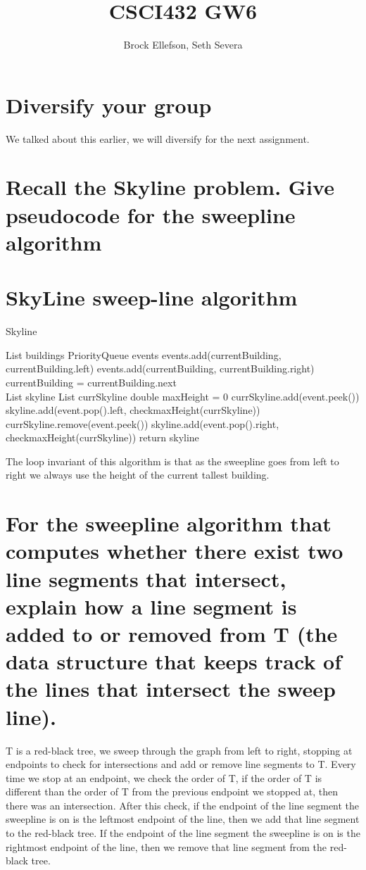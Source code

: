 \documentclass[10pt,a4paper]{article}
\author{Brock Ellefson, Seth Severa}
\title{CSCI432 GW6}
\begin{document}
\maketitle
\section{Diversify your group}
We talked about this earlier, we will diversify for the next assignment.
\section{Recall the Skyline problem. Give pseudocode for the sweepline algorithm}
\section*{SkyLine sweep-line algorithm}
\begin{algorithm}
\caption{Skyline}\label{euclid}
\begin{algorithmic}[1]

\State List buildings
\State PriorityQueue events
\State events.add(currentBuilding, currentBuilding.left)
\State events.add(currentBuilding, currentBuilding.right)
\State currentBuilding = currentBuilding.next
\EndWhile \\
\State List skyline
\State List currSkyline
\State double maxHeight = 0
    \State currSkyline.add(event.peek())
    skyline.add(event.pop().left, checkmaxHeight(currSkyline))
    \EndIf
\Else
    \State currSkyline.remove(event.peek())
    skyline.add(event.pop().right, checkmaxHeight(currSkyline))
    \EndIf
\EndIf
\EndWhile
\State return skyline
\end{algorithmic}
\end{algorithm}
The loop invariant of this algorithm is that as the sweepline goes from left to right we always use the height of the current tallest building. 
\section{For the sweepline algorithm that computes whether there exist two line segments that intersect, explain how a line segment is added to or removed from T (the data structure that keeps track of the lines that intersect the sweep line).}
T is a red-black tree, we sweep through the graph from left to right, stopping at endpoints to check for intersections and add or remove line segments to T. Every time we stop at an endpoint, we check the order of T, if the order of T is different than the order of T from the previous endpoint we stopped at, then there was an intersection. After this check, if the endpoint of the line segment the sweepline is on is the leftmost endpoint of the line, then we add that line segment to the red-black tree. If the endpoint of the line segment the sweepline is on is the rightmost endpoint of the line, then we remove that line segment from the red-black tree.
\end{document}
